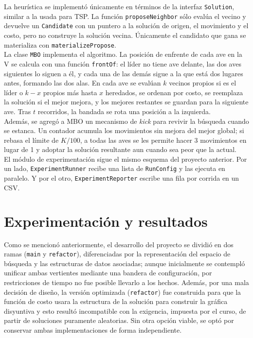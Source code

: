 \documentclass[9pt,a4paper,twocolumn,twoside]{rho-class/rho}
\begin{document}
La heurística se implementó únicamente en términos de la interfaz \texttt{Solution}, similar a la usada para TSP. La función 
\texttt{proposeNeighbor} sólo evalúa el vecino y devuelve un \texttt{Candidate} con un puntero a la solución de origen, el movimiento y
el costo, pero no construye la solución vecina. Únicamente el candidato que gana se materializa con \texttt{materializePropose}. \\

La clase \texttt{MBO} implementa el algoritmo. La posición de enfrente de cada ave en la V se calcula con una función \texttt{frontOf}:
el líder no tiene ave delante, las dos aves siguientes lo siguen a él, y cada una de las demás sigue a la que está dos
lugares antes, formando las dos alas. En cada ave se evalúan $k$ vecinos propios si es el líder o $k-x$ propios más hasta $x$ heredados, 
se ordenan por costo, se reemplaza la solución si el mejor mejora, y los mejores restantes se guardan para la siguiente ave. Tras $t$
recorridos, la bandada se rota una posición a la izquierda. \\

Además, se agregó a MBO un mecanismo de \textit{kick} para revivir la búsqueda cuando se estanca. Un contador acumula los movimientos sin
mejora del mejor global; si rebasa el límite de $K/100$, a todas las aves se les permite hacer 3 movimientos en lugar de 1 y adoptar
la solución resultante aun cuando sea peor que la actual. \\
 
El módulo de experimentación sigue el mismo esquema del proyecto anterior. Por un lado, \texttt{ExperimentRunner} recibe una lista de
\texttt{RunConfig} y las ejecuta en paralelo. Y por el otro, \texttt{ExperimentReporter} escribe una fila por corrida en un CSV.

\section{Experimentación y resultados}
Como se mencionó anteriormente, el desarrollo del proyecto se dividió en dos ramas (\texttt{main} y \texttt{refactor}), 
diferenciadas por la representación del espacio de búsqueda y las estructuras de datos asociadas; aunque inicialmente se contempló unificar ambas
vertientes mediante una bandera de configuración, por restricciones de tiempo no fue posible llevarlo a los hechos. Además, por una mala 
decisión de diseño, la versión optimizada (\texttt{refactor}) fue construida para que la función de costo usara la estructura de la solución
para construir la gráfica disyuntiva y esto resultó incompatible con la exigencia, impuesta por el curso, de partir de soluciones puramente aleatorias. 
Sin otra opción viable, se optó por conservar ambas implementaciones de forma independiente.\\
\end{document}
